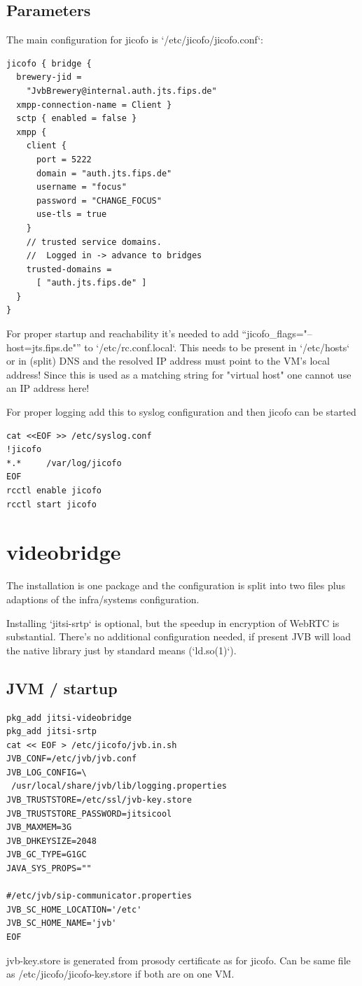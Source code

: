 \documentclass[conference]{IEEEtran}
\begin{document}
\subsection{Parameters}

The main configuration for jicofo is `/etc/jicofo/jicofo.conf`:
\begin{verbatim}
jicofo { bridge {
  brewery-jid = 
    "JvbBrewery@internal.auth.jts.fips.de"
  xmpp-connection-name = Client }
  sctp { enabled = false }
  xmpp {
    client {
      port = 5222
      domain = "auth.jts.fips.de"
      username = "focus"
      password = "CHANGE_FOCUS"
      use-tls = true
    }
    // trusted service domains. 
    //  Logged in -> advance to bridges
    trusted-domains = 
      [ "auth.jts.fips.de" ]
  }
}
\end{verbatim}
For proper startup and reachability it's needed to add ``jicofo_flags="--host=jts.fips.de"''
to `/etc/rc.conf.local`. This needs to be present in `/etc/hosts` or in (split) DNS and the
resolved IP address must point to the VM's local address! Since this is used as a matching
string for "virtual host" one cannot use an IP address here!

For proper logging add this to syslog configuration and then jicofo can be started
\begin{verbatim}
cat <<EOF >> /etc/syslog.conf
!jicofo
*.*     /var/log/jicofo
EOF
rcctl enable jicofo
rcctl start jicofo
\end{verbatim}

\section{videobridge}
The installation is one package and the configuration is split into two files plus
adaptions of the infra/systems configuration.

Installing `jitsi-srtp` is optional, but the speedup in encryption of WebRTC is substantial.
There's no additional configuration needed, if present JVB will load the native library just by
standard means (`ld.so(1)`).

\subsection{JVM / startup}

\begin{verbatim}
pkg_add jitsi-videobridge
pkg_add jitsi-srtp
cat << EOF > /etc/jicofo/jvb.in.sh
JVB_CONF=/etc/jvb/jvb.conf
JVB_LOG_CONFIG=\
 /usr/local/share/jvb/lib/logging.properties
JVB_TRUSTSTORE=/etc/ssl/jvb-key.store
JVB_TRUSTSTORE_PASSWORD=jitsicool
JVB_MAXMEM=3G
JVB_DHKEYSIZE=2048
JVB_GC_TYPE=G1GC
JAVA_SYS_PROPS=""

#/etc/jvb/sip-communicator.properties
JVB_SC_HOME_LOCATION='/etc'
JVB_SC_HOME_NAME='jvb'
EOF
\end{verbatim}
jvb-key.store is generated from prosody certificate as for jicofo. Can be same file 
as /etc/jicofo/jicofo-key.store if both are on one VM.
\end{document}
